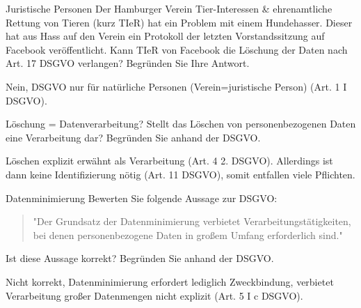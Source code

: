 \documentclass{exercisesheet}
\begin{document}
\begin{exercise}{Juristische Personen}
  Der Hamburger Verein Tier-Interessen \& ehrenamtliche Rettung von Tieren (kurz TIeR) hat ein Problem mit einem Hundehasser. Dieser hat aus Hass auf den Verein ein Protokoll der letzten Vorstandssitzung auf Facebook veröffentlicht. Kann TIeR von Facebook die Löschung der Daten nach Art. 17 DSGVO verlangen? Begründen Sie Ihre Antwort.

  \begin{solution}
    Nein, DSGVO nur für natürliche Personen (Verein=juristische Person) (Art. 1 I DSGVO).
  \end{solution}
\end{exercise}

\begin{exercise}{Löschung = Datenverarbeitung?}
  Stellt das Löschen von personenbezogenen Daten eine Verarbeitung dar? Begründen Sie anhand der DSGVO.

  \begin{solution}
    Löschen explizit erwähnt als Verarbeitung (Art. 4 2. DSGVO). Allerdings ist dann keine Identifizierung nötig (Art. 11 DSGVO), somit entfallen viele Pflichten.
  \end{solution}
\end{exercise}

\begin{exercise}{Datenminimierung}\label{ex:datenminimierung}
  Bewerten Sie folgende Aussage zur DSGVO:
  \begin{quote}"Der Grundsatz der Datenminimierung verbietet Verarbeitungstätigkeiten, bei denen personenbezogene Daten in großem Umfang erforderlich sind."\end{quote}
  Ist diese Aussage korrekt? Begründen Sie anhand der DSGVO.

  \begin{solution}
    Nicht korrekt, Datenminimierung erfordert lediglich Zweckbindung, verbietet Verarbeitung großer Datenmengen nicht explizit (Art. 5 I c DSGVO).
  \end{solution}
\end{exercise}
\end{document}
